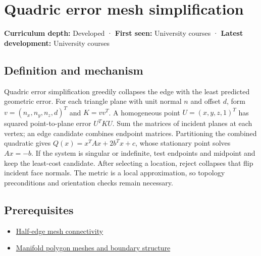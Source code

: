 \hypertarget{appendix-1dd4ad54ca57}{}\label{referencestart:appendix-1dd4ad54ca57}
\section{Quadric error mesh simplification}\label{appendix-1dd4ad54ca57-quadric-error-mesh-simplification}

\hypertarget{appendix-1dd4ad54ca57-quadric-error-mesh-simplification}{}

\textbf{Curriculum depth:} Developed · \textbf{First seen:} University courses · \textbf{Latest development:} University courses

\begin{allmightroledefinition}

\subsection{Definition and mechanism}\label{appendix-1dd4ad54ca57-definition-and-mechanism}

\hypertarget{appendix-1dd4ad54ca57-definition-and-mechanism}{}

Quadric error simplification greedily collapses the edge with the least predicted geometric error. For each triangle plane with unit normal \(n\) and offset \(d\), form \(v=(n_x,n_y,n_z,d)^T\) and \(K=vv^T\). A homogeneous point \(U=(x,y,z,1)^T\) has squared point-to-plane error \(U^TKU\). Sum the matrices of incident planes at each vertex; an edge candidate combines endpoint matrices. Partitioning the combined quadratic gives \(Q(x)=x^TAx+2b^Tx+c\), whose stationary point solves \(Ax=-b\). If the system is singular or indefinite, test endpoints and midpoint and keep the least-cost candidate. After selecting a location, reject collapses that flip incident face normals. The metric is a local approximation, so topology preconditions and orientation checks remain necessary.

\end{allmightroledefinition}

\subsection{Prerequisites}\label{appendix-1dd4ad54ca57-prerequisites}

\hypertarget{appendix-1dd4ad54ca57-prerequisites}{}

\begin{itemize}
\tightlist
\item
  \hyperref[appendix-1aea26b2307f]{Half-edge mesh connectivity}
\item
  \hyperref[appendix-fab348609369]{Manifold polygon meshes and boundary structure}
\end{itemize}

